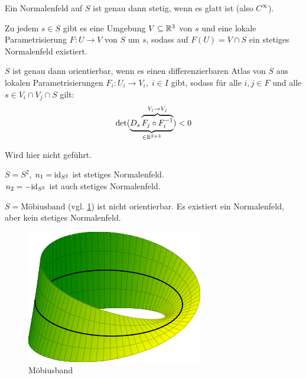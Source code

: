 \begin{bemerkung}%
    \begin{bemenum}
        \item Ein Normalenfeld auf $S$ ist genau dann stetig, wenn es
              glatt ist (also $C^\infty$).
        \item Zu jedem $s \in S$ gibt es eine Umgebung $V \subseteq \mathbb{R}^3$
              von $s$ und eine lokale Parametrisierung $F: U \rightarrow V$
              von $S$ um $s$, sodass auf $F(U) = V \cap S$
              ein stetiges Normalenfeld existiert.
        \item $S$ ist genau dann orientierbar, wenn es einen 
              differenzierbaren Atlas von $S$ aus lokalen Parametrisierungen
              $F_i: U_i \rightarrow V_i,\;i \in I$ gibt, sodass
              für alle $i, j \in F$ und alle $s \in V_i \cap V_j \cap S$
              gilt:
              \[\det(\underbrace{D_s \overbrace{F_j \circ F_i^{-1}}^{V_i \rightarrow V_j}}_{\in \mathbb{R}^{3 \times 3}}) < 0\]
    \end{bemenum}
\end{bemerkung}

\begin{beweis}
    Wird hier nicht geführt.%
\end{beweis}

\begin{beispiel}
    \begin{bspenum}
        \item $S = S^2$, $n_1 = \textnormal{id}_{S^2}$ ist stetiges Normalenfeld.\\
              $n_2 = - \textnormal{id}_{S^2}$ ist auch stetiges Normalenfeld.
        \item $S = \text{Möbiusband}$ (vgl. \cref{fig:moebius-strip})
              ist nicht orientierbar. Es existiert ein Normalenfeld,
              aber kein stetiges Normalenfeld.
    \end{bspenum}
\end{beispiel}

\begin{figure}[htp]
    \centering
    \includegraphics[width=0.5\linewidth, keepaspectratio]{figures/moebius-strip.pdf} 
    \caption{Möbiusband}
    \label{fig:moebius-strip}
\end{figure}

